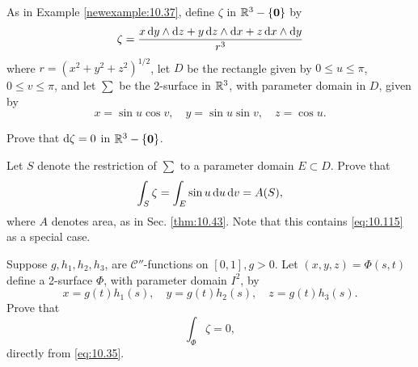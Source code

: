 \begin{myexercise}   
    \label{ex:10.22}
    As in Example \ref{newexample:10.37}, define $\zeta$ in ${\protect\mathbb R}^3 - \{\mathbf{0}\}$ by
    \begin{equation*}
        \zeta = 
        \frac{
            x \d y \wedge \d z + 
            y \d z \wedge \d x + 
            z \d x \wedge \d y 
        }{r^3}
    \end{equation*}
    where $r = \left( x^2+y^2+z^2 \right)^{1/2}$,
    let $D$ be the rectangle given by 
    $0 \leq u \leq \pi$,
    $0 \leq v \leq \pi$,
    and let $\sum$ be the 2-surface in ${\protect\mathbb R}^3$,
    with parameter domain in $D$, given by 
    \begin{equation*}
        x = \sin u \cos v, \quad
        y = \sin u \sin v, \quad
        z = \cos u .
    \end{equation*}
    \begin{asparaenum}[(a)]
        \item Prove that $\d \zeta = 0$ in ${\protect\mathbb R}^3 - \{\mathbf{0}\}$.
        \item Let $S$ denote the restriction of $\sum$ to a parameter domain $E \subset D$. 
        Prove that
        \begin{equation*}
            \int_S \zeta = \int_E \sin u \d u \d v = A(S),
        \end{equation*}
        where $A$ denotes area, as in Sec. \ref{thm:10.43}.
        Note that this contains \eqref{eq:10.115} as a special case.
        \item Suppose $g, h_1, h_2, h_3$, are $\mathscr{C}''$-functions on $[0, 1], g > 0$. 
        Let $(x, y, z) = \Phi(s, t)$
        define a 2-surface $\Phi$, with parameter domain $I^2$, by
        \begin{equation*}
            x = g(t)h_1(s) , \quad 
            y = g(t)h_2(s) , \quad 
            z = g(t)h_3(s) .
        \end{equation*}
        Prove that 
        \begin{equation*}
            \int_{\Phi} \zeta = 0 ,
        \end{equation*}
        directly from \eqref{eq:10.35}.


\end{asparaenum}
\end{myexercise}
